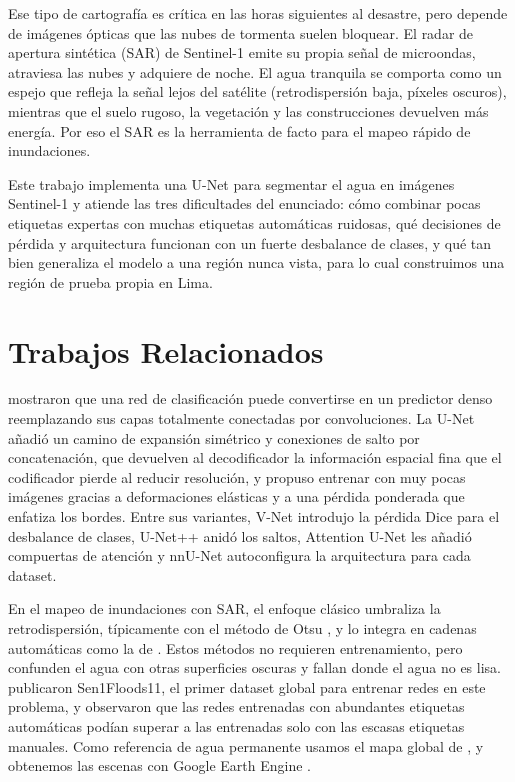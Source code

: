 \documentclass[10pt]{article}
\begin{document}
Ese tipo de cartografía es crítica en las horas siguientes al desastre, pero depende de imágenes ópticas que las nubes de tormenta suelen bloquear. El radar de apertura sintética (SAR) de Sentinel-1 \citep{torres2012} emite su propia señal de microondas, atraviesa las nubes y adquiere de noche. El agua tranquila se comporta como un espejo que refleja la señal lejos del satélite (retrodispersión baja, píxeles oscuros), mientras que el suelo rugoso, la vegetación y las construcciones devuelven más energía. Por eso el SAR es la herramienta de facto para el mapeo rápido de inundaciones.

Este trabajo implementa una U-Net \citep{ronneberger2015} para segmentar el agua en imágenes Sentinel-1 y atiende las tres dificultades del enunciado: cómo combinar pocas etiquetas expertas con muchas etiquetas automáticas ruidosas, qué decisiones de pérdida y arquitectura funcionan con un fuerte desbalance de clases, y qué tan bien generaliza el modelo a una región nunca vista, para lo cual construimos una región de prueba propia en Lima.

\section{Trabajos Relacionados}
\label{sec:rel}
\citet{long2015} mostraron que una red de clasificación puede convertirse en un predictor denso reemplazando sus capas totalmente conectadas por convoluciones. La U-Net \citep{ronneberger2015} añadió un camino de expansión simétrico y conexiones de salto por concatenación, que devuelven al decodificador la información espacial fina que el codificador pierde al reducir resolución, y propuso entrenar con muy pocas imágenes gracias a deformaciones elásticas y a una pérdida ponderada que enfatiza los bordes. Entre sus variantes, V-Net \citep{milletari2016} introdujo la pérdida Dice para el desbalance de clases, U-Net++ \citep{zhou2018} anidó los saltos, Attention U-Net \citep{oktay2018} les añadió compuertas de atención y nnU-Net \citep{isensee2021} autoconfigura la arquitectura para cada dataset.

En el mapeo de inundaciones con SAR, el enfoque clásico umbraliza la retrodispersión, típicamente con el método de Otsu \citep{otsu1979}, y lo integra en cadenas automáticas como la de \citet{twele2016}. Estos métodos no requieren entrenamiento, pero confunden el agua con otras superficies oscuras y fallan donde el agua no es lisa. \citet{bonafilia2020} publicaron Sen1Floods11, el primer dataset global para entrenar redes en este problema, y observaron que las redes entrenadas con abundantes etiquetas automáticas podían superar a las entrenadas solo con las escasas etiquetas manuales. Como referencia de agua permanente usamos el mapa global de \citet{pekel2016}, y obtenemos las escenas con Google Earth Engine \citep{gorelick2017}.
\end{document}
